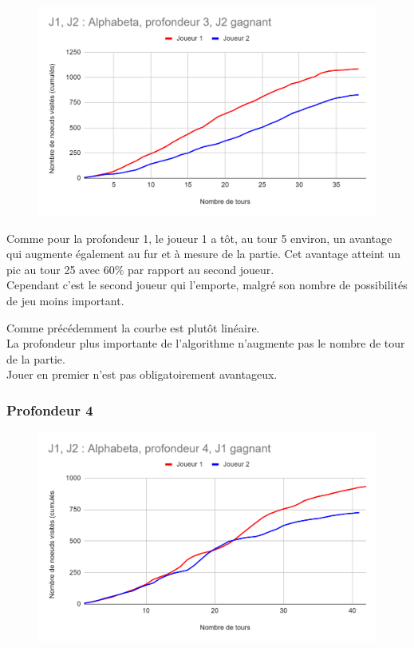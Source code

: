 \documentclass[12pt]{article}
\begin{document}
\begin{figure}[!h]
   \includegraphics[width=\textwidth]{prof3alphabeta.png}
\end{figure}

Comme pour la profondeur 1, le joueur 1 a tôt, au tour 5 environ, un avantage qui augmente également au fur et à mesure de la partie. Cet avantage atteint un pic au tour 25 avec 60\% par rapport au second joueur.\\
Cependant c'est le second joueur qui l'emporte, malgré son nombre de possibilités de jeu moins important.

Comme précédemment la courbe est plutôt linéaire.\\
La profondeur plus importante de l'algorithme n'augmente pas le nombre de tour de la partie.\\
Jouer en premier n'est pas obligatoirement avantageux.
\newpage
\subsubsection{Profondeur 4}

\begin{figure}[!h]
   \includegraphics[width=\textwidth]{prof4alphabeta.png}
\end{figure}
\end{document}
